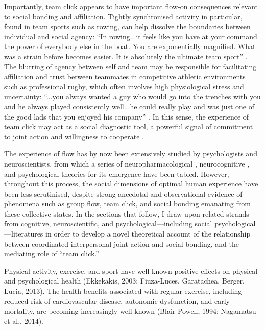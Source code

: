 Importantly, team click appears to have important flow-on consequences relevant to social bonding and affiliation. Tightly synchronised activity in particular, found in team sports such as rowing, can help dissolve the boundaries between individual and social agency: ``In rowing...it feels like you have at your command the power of everybody else in the boat. You are exponentially magnified. What was a strain before becomes easier. It is absolutely the ultimate team sport'' \citep{Brown2016}.
The blurring of agency between self and team may be responsible for facilitating affiliation and trust between teammates in competitive athletic environments such as professional rugby, which often involves high physiological stress and uncertainty: ``...you always wanted a guy who would go into the trenches with you and he always played consistently well...he could really play and was just one of the good lads that you enjoyed his company'' \citep{Fox-Sports2017}. In this sense, the experience of team click may act as a social diagnostic tool, a powerful signal of commitment to joint action and willingness to cooperate \citep{Reddish2013a}.

The experience of flow has by now been extensively studied by psychologists and neuroscientists, from which a series of neuropharmacological \citep{Boecker2008}, neurocognitive \citep{Dietrich2006,Dietrich2011,Labelle2013}, and psychological \citep{Csikszentmihalyi1992} theories for its emergence have been tabled.  However, throughout this process, the social dimensions of optimal human experience have been less scrutinised, despite strong anecdotal and observational evidence of phenomena such as group flow, team click, and social bonding emanating from these collective states. In the sections that follow, I draw upon related strands from cognitive, neuroscientific, and psychological---including social psychological---literatures in order to develop a novel theoretical account of the relationship between coordinated interpersonal joint action and social bonding, and the mediating role of ``team click.''




Physical activity, exercise, and sport have well-known positive effects on physical and  psychological health (Ekkekakis, 2003; Fiuza-Luces, Garatachea, Berger,  Lucia, 2013).
The health benefits associated with regular exercise, including reduced risk of cardiovascular disease, autonomic dysfunction, and early mortality, are becoming increasingly well-known (Blair  Powell, 1994; Nagamatsu et al., 2014).

